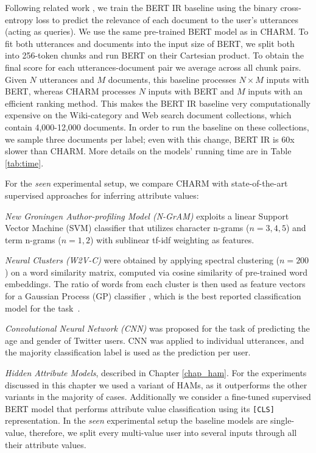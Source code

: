 Following related work \cite{nogueira2019passage, dai2019deeper}, we train the BERT IR baseline using the binary cross-entropy loss to predict the relevance of each document to the user's utterances (acting as queries).
We use the same pre-trained BERT model as in CHARM.
To fit both utterances and documents into the input size of BERT, we split both into 256-token chunks and run BERT on their Cartesian product. To obtain the final score for each utterances-document pair we average across all chunk pairs.
Given $N$ utterances and $M$ documents, this baseline processes $N \times M$ inputs with BERT, whereas CHARM processes $N$ inputs with BERT and $M$ inputs with an efficient ranking method.
This makes the BERT IR baseline very computationally expensive on the Wiki-category and Web search document collections, which contain 4,000-12,000 documents.
In order to run the baseline on these collections, we sample three documents per label; even with this change, BERT IR is 60x slower than CHARM. More details on the models' running time are in Table \ref{tab:time}.

For the \emph{seen} experimental setup, we compare CHARM with state-of-the-art supervised approaches for inferring attribute values:
\squishlist
    \item \emph{New Groningen Author-profiling Model (N-GrAM)} \cite{basile:2017} exploits a linear Support Vector Machine (SVM) classifier \cite{cortes1995support} that utilizes character n-grams ($n=3,4,5$) and term n-grams ($n=1,2$) with sublinear tf-idf weighting as features. 
    \item \emph{Neural Clusters (W2V-C)} \cite{pietro:ACL15} were obtained by applying spectral clustering ($n=200$) on a word similarity matrix, computed via cosine similarity of pre-trained word embeddings. The ratio of words from each cluster is then used as feature vectors for a Gaussian Process (GP) classifier \cite{chu2005gaussian}, which is the best reported classification model for the task~\cite{pietro:ACL15}. 
    \item \emph{Convolutional Neural Network (CNN)} \cite{bayot:MOD17} was proposed for the task of predicting the age and gender of Twitter users. CNN was applied to individual utterances, and the majority classification label is used as the prediction per user.
    \item \emph{Hidden Attribute Models}, described in Chapter \ref{chap_ham}. For the experiments discussed in this chapter we used a  variant of HAMs, as it outperforms the other variants in the majority of cases.
\squishend
Additionally we consider a fine-tuned supervised BERT model that performs attribute value classification using its \texttt{[CLS]} representation.
In the \textit{seen} experimental setup the baseline models are single-value, therefore, we split every multi-value user into several inputs through all their attribute values.

